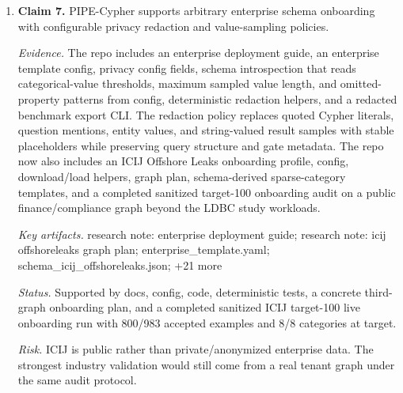 \begin{enumerate}
\textit{Key artifacts.} code: judge.py; code: calibration.py; code: judge\_audit\_packet.py; script: create judge annotation sheets; +3 more\par
\textit{Status.} Supported by completed human audit summary.\par
\textit{Risk.} The judge appears conservative on this sample; larger audits or different enterprise schemas may reveal false accepts.
\item \textbf{Claim 7.} PIPE-Cypher supports arbitrary enterprise schema onboarding with configurable privacy redaction and value-sampling policies.\par
\textit{Evidence.} The repo includes an enterprise deployment guide, an enterprise template config, privacy config fields, schema introspection that reads categorical-value thresholds, maximum sampled value length, and omitted-property patterns from config, deterministic redaction helpers, and a redacted benchmark export CLI. The redaction policy replaces quoted Cypher literals, question mentions, entity values, and string-valued result samples with stable placeholders while preserving query structure and gate metadata. The repo now also includes an ICIJ Offshore Leaks onboarding profile, config, download/load helpers, graph plan, schema-derived sparse-category templates, and a completed sanitized target-100 onboarding audit on a public finance/compliance graph beyond the LDBC study workloads.\par
\textit{Key artifacts.} research note: enterprise deployment guide; research note: icij offshoreleaks graph plan; enterprise\_template.yaml; schema\_icij\_offshoreleaks.json; +21 more\par
\textit{Status.} Supported by docs, config, code, deterministic tests, a concrete third-graph onboarding plan, and a completed sanitized ICIJ target-100 live onboarding run with 800/983 accepted examples and 8/8 categories at target.\par
\textit{Risk.} ICIJ is public rather than private/anonymized enterprise data. The strongest industry validation would still come from a real tenant graph under the same audit protocol.
\end{enumerate}
